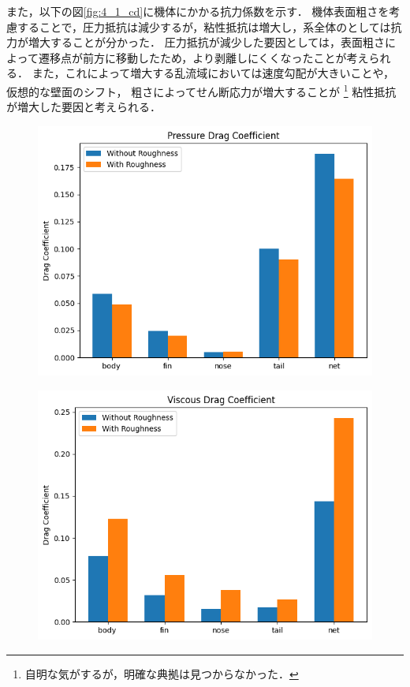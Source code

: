 \documentclass[uplatex,dvipdfmx,a4j,12pt]{jsarticle}
\begin{document}
また，以下の図\ref{fig:4_1_cd}に機体にかかる抗力係数を示す．
機体表面粗さを考慮することで，圧力抵抗は減少するが，粘性抵抗は増大し，系全体のとしては抗力が増大することが分かった．
圧力抵抗が減少した要因としては，表面粗さによって遷移点が前方に移動したため，より剥離しにくくなったことが考えられる．
また，これによって増大する乱流域においては速度勾配が大きいことや，仮想的な壁面のシフト，
粗さによってせん断応力が増大することが
\footnote{自明な気がするが，明確な典拠は見つからなかった．}
粘性抵抗が増大した要因と考えられる．
\begin{figure}[H]
  \centering
  \begin{minipage}{0.45\linewidth}
      \centering
      \includegraphics[width=\linewidth]{wall_function/img/4_1_pressure_drag.png}
      \label{fig:4_1_cd_pressure}
  \end{minipage}
  \begin{minipage}{0.45\linewidth}
      \centering
      \includegraphics[width=\linewidth]{wall_function/img/4_1_viscous_drag.png}

\end{minipage}
\end{figure}
\end{document}
